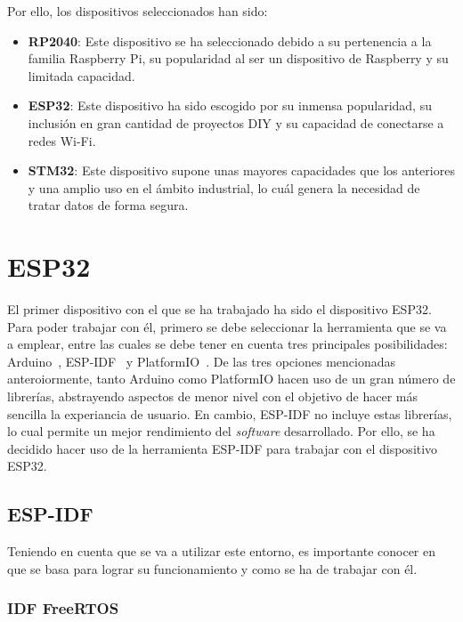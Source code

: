 Por ello, los dispositivos seleccionados han sido:

\begin{itemize}
    \item \textbf{RP2040}: Este dispositivo se ha seleccionado debido a su pertenencia a la familia Raspberry Pi, su popularidad al ser un dispositivo de Raspberry y su limitada capacidad.
    \item \textbf{ESP32}: Este dispositivo ha sido escogido por su inmensa popularidad, su inclusión en gran cantidad de proyectos \ac{DIY} y su capacidad de conectarse a redes Wi-Fi.
    \item \textbf{STM32}: Este dispositivo supone unas mayores capacidades que los anteriores y una amplio uso en el ámbito industrial, lo cuál genera la necesidad de tratar datos de forma segura.
\end{itemize}


\section{ESP32}\label{sec:esp32}

El primer dispositivo con el que se ha trabajado ha sido el dispositivo ESP32.
Para poder trabajar con él, primero se debe seleccionar la herramienta que se va a emplear, entre las cuales se debe tener en cuenta tres principales posibilidades: Arduino~\cite{arduino}, ESP-IDF~\cite{espressif} y PlatformIO~\cite{platformio}.
De las tres opciones mencionadas anteroiormente, tanto Arduino como PlatformIO hacen uso de un gran número de librerías, abstrayendo aspectos de menor nivel con el objetivo de hacer más sencilla la experiancia de usuario.
En cambio, ESP-IDF no incluye estas librerías, lo cual permite un mejor rendimiento del \textit{software} desarrollado.
Por ello, se ha decidido hacer uso de la herramienta ESP-IDF para trabajar con el dispositivo ESP32.


\subsection{ESP-IDF}\label{subsec:espressif}

Teniendo en cuenta que se va a utilizar este entorno, es importante conocer en que se basa para lograr su funcionamiento y como se ha de trabajar con él.

\subsubsection{IDF FreeRTOS}\label{subsubsec:freertos}

